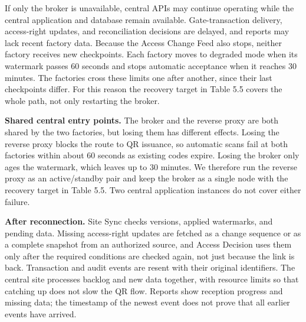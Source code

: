 If only the broker is unavailable, central APIs may continue operating while the central application and database remain available. Gate-transaction delivery, access-right updates, and reconciliation decisions are delayed, and reports may lack recent factory data. Because the Access Change Feed also stops, neither factory receives new checkpoints. Each factory moves to degraded mode when its watermark passes 60 seconds and stops automatic acceptance when it reaches 30 minutes. The factories cross these limits one after another, since their last checkpoints differ. For this reason the recovery target in Table 5.5 covers the whole path, not only restarting the broker.


\textbf{Shared central entry points.} The broker and the reverse proxy are both shared by the two factories, but losing them has different effects. Losing the reverse proxy blocks the route to QR issuance, so automatic scans fail at both factories within about 60 seconds as existing codes expire. Losing the broker only ages the watermark, which leaves up to 30 minutes. We therefore run the reverse proxy as an active/standby pair and keep the broker as a single node with the recovery target in Table 5.5. Two central application instances do not cover either failure.


\textbf{After reconnection.} Site Sync checks versions, applied watermarks, and pending data. Missing access-right updates are fetched as a change sequence or as a complete snapshot from an authorized source, and Access Decision uses them only after the required conditions are checked again, not just because the link is back. Transaction and audit events are resent with their original identifiers. The central site processes backlog and new data together, with resource limits so that catching up does not slow the QR flow. Reports show reception progress and missing data; the timestamp of the newest event does not prove that all earlier events have arrived.

